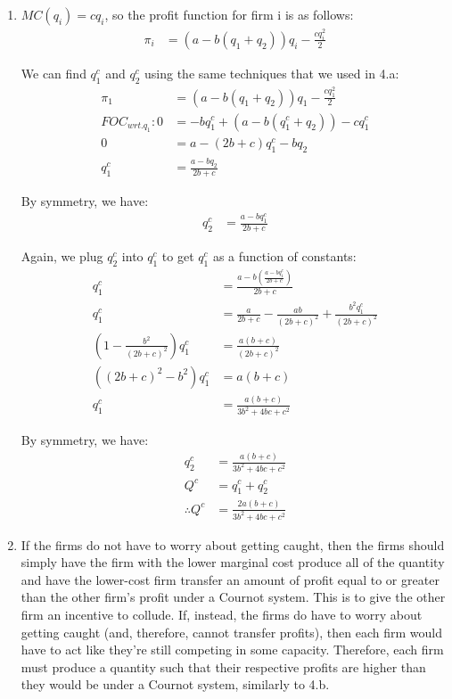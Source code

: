 \documentclass[12pt,letterpaper]{article}
\begin{document}
\begin{enumerate}
\begin{enumerate}
    \item $MC(q_i) = cq_i$, so the profit function for firm i is as follows:
    \begin{align*}
        \pi_i &= (a - b(q_1 + q_2))q_i - \frac{cq_i^2}{2}
    \end{align*}
    
    We can find $q_1^c$ and $q_2^c$ using the same techniques that we used in 4.a:
    \begin{align*}
        \pi_1 &= (a - b(q_1 + q_2))q_1 - \frac{cq_1^2}{2}\\
        FOC_{wrt.q_1}: 0 &= -bq_1^c + (a-b(q_1^c + q_2)) - cq_1^c\\
        0 &= a - (2b + c)q_1^c - bq_2\\
        q_1^c &= \frac{a - bq_2}{2b + c}
    \end{align*}
    
    By symmetry, we have:
    \begin{align*}
        q_2^c &= \frac{a - bq_1^c}{2b + c}
    \end{align*}
    
    Again, we plug $q_2^c$ into $q_1^c$ to get $q_1^c$ as a function of constants:
    \begin{align*}
        q_1^c &= \frac{a - b(\frac{a - bq_1^c}{2b + c})}{2b + c}\\
        q_1^c &= \frac{a}{2b+c} - \frac{ab}{(2b+c)^2} + \frac{b^2q_1^c}{(2b+c)^2}\\
        (1-\frac{b^2}{(2b+c)^2})q_1^c &= \frac{a(b+c)}{(2b+c)^2}\\
        ((2b+c)^2 - b^2)q_1^c &= a(b+c)\\
        q_1^c &= \frac{a(b+c)}{3b^2 + 4bc + c^2}
    \end{align*}
    
    By symmetry, we have:
    \begin{align*}
        q_2^c &= \frac{a(b+c)}{3b^2 + 4bc + c^2}\\
        Q^c &= q_1^c + q_2^c\\
        \therefore Q^c &= \frac{2a(b+c)}{3b^2 + 4bc + c^2}
    \end{align*}
    
    \item If the firms do not have to worry about getting caught, then the firms should simply have the firm with the lower marginal cost produce all of the quantity and have the lower-cost firm transfer an amount of profit equal to or greater than the other firm's profit under a Cournot system. This is to give the other firm an incentive to collude. If, instead, the firms do have to worry about getting caught (and, therefore, cannot transfer profits), then each firm would have to act like they're still competing in some capacity. Therefore, each firm must produce a quantity such that their respective profits are higher than they would be under a Cournot system, similarly to 4.b.

\end{enumerate}


\end{enumerate}
	
\end{document}
